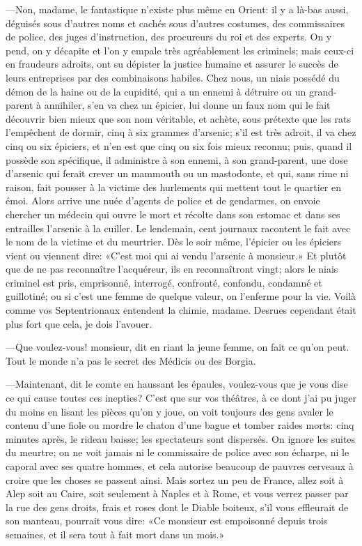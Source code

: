 —Non, madame, le fantastique n'existe plus même en Orient: il y a là-bas aussi, déguisés sous d'autres noms et cachés sous d'autres costumes, des commissaires de police, des juges d'instruction, des procureurs du roi et des experts. On y pend, on y décapite et l'on y empale très agréablement les criminels; mais ceux-ci en fraudeurs adroits, ont su dépister la justice humaine et assurer le succès de leurs entreprises par des combinaisons habiles. Chez nous, un niais possédé du démon de la haine ou de la cupidité, qui a un ennemi à détruire ou un grand-parent à annihiler, s'en va chez un épicier, lui donne un faux nom qui le fait découvrir bien mieux que son nom véritable, et achète, sous prétexte que les rats l'empêchent de dormir, cinq à six grammes d'arsenic; s'il est très adroit, il va chez cinq ou six épiciers, et n'en est que cinq ou six fois mieux reconnu; puis, quand il possède son spécifique, il administre à son ennemi, à son grand-parent, une dose d'arsenic qui ferait crever un mammouth ou un mastodonte, et qui, sans rime ni raison, fait pousser à la victime des hurlements qui mettent tout le quartier en émoi. Alors arrive une nuée d'agents de police et de gendarmes, on envoie chercher un médecin qui ouvre le mort et récolte dans son estomac et dans ses entrailles l'arsenic à la cuiller. Le lendemain, cent journaux racontent le fait avec le nom de la victime et du meurtrier. Dès le soir même, l'épicier ou les épiciers vient ou viennent dire: «C'est moi qui ai vendu l'arsenic à monsieur.» Et plutôt que de ne pas reconnaître l'acquéreur, ils en reconnaîtront vingt; alors le niais criminel est pris, emprisonné, interrogé, confronté, confondu, condamné et guillotiné; ou si c'est une femme de quelque valeur, on l'enferme pour la vie. Voilà comme vos Septentrionaux entendent la chimie, madame. Desrues cependant était plus fort que cela, je dois l'avouer. 

—Que voulez-vous! monsieur, dit en riant la jeune femme, on fait ce qu'on peut. Tout le monde n'a pas le secret des Médicis ou des Borgia. 

—Maintenant, dit le comte en haussant les épaules, voulez-vous que je vous dise ce qui cause toutes ces inepties? C'est que sur vos théâtres, à ce dont j'ai pu juger du moins en lisant les pièces qu'on y joue, on voit toujours des gens avaler le contenu d'une fiole ou mordre le chaton d'une bague et tomber raides morts: cinq minutes après, le rideau baisse; les spectateurs sont dispersés. On ignore les suites du meurtre; on ne voit jamais ni le commissaire de police avec son écharpe, ni le caporal avec ses quatre hommes, et cela autorise beaucoup de pauvres cerveaux à croire que les choses se passent ainsi. Mais sortez un peu de France, allez soit à Alep soit au Caire, soit seulement à Naples et à Rome, et vous verrez passer par la rue des gens droits, frais et roses dont le Diable boiteux, s'il vous effleurait de son manteau, pourrait vous dire: «Ce monsieur est empoisonné depuis trois semaines, et il sera tout à fait mort dans un mois.» 

